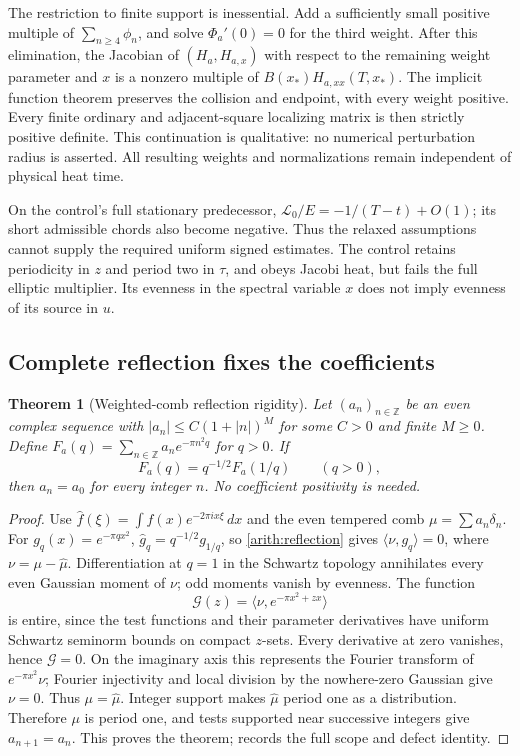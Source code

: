 \documentclass[11pt]{article}
\numberwithin{equation}{section}
\newtheorem{theorem}{Theorem}[section]
\theoremstyle{definition}
\theoremstyle{remark}
\begin{document}
The restriction to finite support is inessential.  Add a sufficiently
small positive multiple of $\sum_{n\ge4}\phi_n$, and solve
$\Phi_a'(0)=0$ for the third weight.  After this elimination, the Jacobian
of $(H_a,H_{a,x})$ with respect to the remaining weight parameter and $x$
is a nonzero multiple of $B(x_*)H_{a,xx}(T,x_*)$.  The implicit function
theorem preserves the collision and endpoint, with every weight positive.
Every finite ordinary and adjacent-square localizing matrix is then
strictly positive definite.  This continuation is qualitative: no numerical
perturbation radius is asserted.  All resulting weights and normalizations
remain independent of physical heat time.

On the control's full stationary predecessor,
$\mathcal L_0/E=-1/(T-t)+O(1)$; its short admissible chords also become
negative.  Thus the relaxed assumptions cannot supply the required uniform
signed estimates.  The control retains periodicity in $z$ and period two in
$\tau$, and obeys Jacobi heat, but fails the full elliptic multiplier.
Its evenness in the spectral variable $x$ does not imply evenness of its
source in $u$.

\subsection{Complete reflection fixes the coefficients}

\begin{theorem}[Weighted-comb reflection rigidity]
\label{arith:reflection-rigidity}
Let $(a_n)_{n\in\mathbb Z}$ be an even complex sequence with
$|a_n|\le C(1+|n|)^M$ for some $C>0$ and finite $M\ge0$.  Define
$F_a(q)=\sum_{n\in\mathbb Z}a_ne^{-\pi n^2q}$ for $q>0$.
If
\begin{equation}
 F_a(q)=q^{-1/2}F_a(1/q)\qquad(q>0),
 \label{arith:reflection}
\end{equation}
then $a_n=a_0$ for every integer $n$.  No coefficient positivity is needed.
\end{theorem}
\begin{proof}
Use $\widehat f(\xi)=\int f(x)e^{-2\pi ix\xi}\,dx$ and the even tempered
comb $\mu=\sum a_n\delta_n$.  For $g_q(x)=e^{-\pi qx^2}$,
$\widehat g_q=q^{-1/2}g_{1/q}$, so \eqref{arith:reflection} gives
$\langle\nu,g_q\rangle=0$, where $\nu=\mu-\widehat\mu$.
Differentiation at $q=1$ in the Schwartz topology annihilates every even
Gaussian moment of $\nu$; odd moments vanish by evenness.
The function
\[
 \mathcal G(z)=\langle\nu,e^{-\pi x^2+zx}\rangle
\]
is entire, since the test functions and their parameter derivatives have
uniform Schwartz seminorm bounds on compact $z$-sets.  Every derivative
at zero vanishes, hence $\mathcal G=0$.  On the imaginary axis this
represents the Fourier transform of $e^{-\pi x^2}\nu$; Fourier injectivity
and local division by the nowhere-zero Gaussian give $\nu=0$.
Thus $\mu=\widehat\mu$.  Integer support makes $\widehat\mu$ period one
as a distribution.  Therefore $\mu$ is period one, and tests supported
near successive integers give $a_{n+1}=a_n$.  This proves the theorem;
\cite{ThetaReflection} records the full scope and defect identity.
\end{proof}
\end{document}
